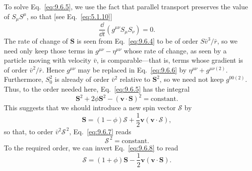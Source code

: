 To solve Eq.~\eqref{eq:9.6.5}, we use the fact that parallel transport
preserves the value of \(S_\mu S^\mu\), so that [see
Eq.~\eqref{eq:5.1.10}]
\begin{equation}
  \frac{\dd}{\dd t}\left(g^{\mu\nu}S_\mu S_\nu\right)=0.
  \tag{9.6.6}\label{eq:9.6.6}
\end{equation}
The rate of change of \(\mathbf S\) is seen from Eq.~\eqref{eq:9.6.4} to
be of order \(S\bar v^3/\bar r\), so we need only keep those terms in
\(g^{\mu\nu}-\eta^{\mu\nu}\) whose rate of change, as seen by a particle
moving with velocity \(\bar v\), is comparable---that is, terms whose
gradient is of order \(\bar v^2/\bar r\). Hence \(g^{\mu\nu}\) may be
replaced in Eq.~\eqref{eq:9.6.6} by
\(\eta^{\mu\nu}+g^{\mu\nu(2)}\). Furthermore, \(S_0^2\) is already of
order \(\bar v^2\) relative to \(\mathbf S^2\), so we need not keep
\(g^{00(2)}\). Thus, to the order needed here,
Eq.~\eqref{eq:9.6.5} has the integral
\begin{equation}
  \mathbf S^2+2\phi\mathbf S^2-(\mathbf v\cdot\mathbf S)^2
  =\text{constant}.
  \tag{9.6.7}\label{eq:9.6.7}
\end{equation}
This suggests that we should introduce a new spin vector
\(\boldsymbol{\mathcal S}\) by
\begin{equation}
  \mathbf S
  =
  (1-\phi)\boldsymbol{\mathcal S}
  +\frac12\mathbf v(\mathbf v\cdot\boldsymbol{\mathcal S}),
  \tag{9.6.8}\label{eq:9.6.8}
\end{equation}
so that, to order \(\bar v^2\boldsymbol{\mathcal S}^{\,2}\),
Eq.~\eqref{eq:9.6.7} reads
\begin{equation}
  \boldsymbol{\mathcal S}^{\,2}=\text{constant}.
  \tag{9.6.9}\label{eq:9.6.9}
\end{equation}
To the required order, we can invert Eq.~\eqref{eq:9.6.8} to read
\begin{equation}
  \boldsymbol{\mathcal S}
  =
  (1+\phi)\mathbf S
  -\frac12\mathbf v(\mathbf v\cdot\mathbf S).
  \tag{9.6.10}\label{eq:9.6.10}
\end{equation}

